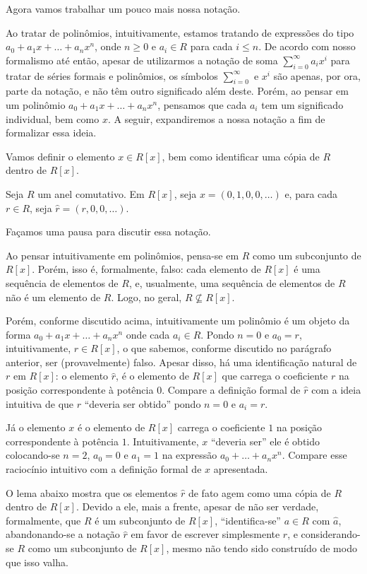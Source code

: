 Agora vamos trabalhar um pouco mais nossa notação.

Ao tratar de polinômios, intuitivamente, estamos tratando de expressões do tipo $a_0+a_1x+\dots+a_nx^n$, onde $n\geq 0$ e $a_i \in R$ para cada $i\leq n$.
De acordo com nosso formalismo até então, apesar de utilizarmos a notação de soma $\sum_{i=0}^\infty a_i x^i$ para tratar de séries formais e polinômios, os símbolos $\sum_{i=0}^\infty$ e $x^i$ são apenas, por ora, parte da notação, e não têm outro significado além deste. Porém, ao pensar em um polinômio $a_0+a_1x+\dots+a_nx^n$, pensamos que cada $a_i$ tem um significado individual, bem como $x$. A seguir, expandiremos a nossa notação a fim de formalizar essa ideia.

Vamos definir o elemento $x \in R[x]$, bem como identificar uma cópia de $R$ dentro de $R[x]$.

\begin{definition}
    Seja $R$ um anel comutativo. Em $R[x]$, seja $x=(0, 1, 0, 0, \dots)$ e, para cada $r \in R$, seja $\hat r=(r, 0, 0, \dots)$.
\end{definition}

Façamos uma pausa para discutir essa notação.

Ao pensar intuitivamente em polinômios, pensa-se em $R$ como um subconjunto de $R[x]$.
Porém, isso é, formalmente, falso: cada elemento de $R[x]$ é uma sequência de elementos de $R$, e, usualmente, uma sequência de elementos de $R$ não é um elemento de $R$.
Logo, no geral, $R\not \subseteq R[x]$.

Porém, conforme discutido acima, intuitivamente um polinômio é um objeto da forma $a_0+a_1x+\dots+a_nx^n$ onde cada $a_i \in R$.
Pondo $n=0$ e $a_0=r$, intuitivamente, $r\in R[x]$, o que sabemos, conforme discutido no parágrafo anterior, ser (provavelmente) falso.
Apesar disso, há uma identificação natural de $r$ em $R[x]$: o elemento $\hat r$, é o elemento de $R[x]$ que carrega o coeficiente $r$ na posição correspondente à potência $0$. Compare a definição formal de $\hat r$ com a ideia intuitiva de que $r$ ``deveria ser obtido'' pondo $n=0$ e $a_i=r$.

Já o elemento $x$ é o elemento de $R[x]$ carrega o coeficiente $1$ na posição correspondente à potência $1$. Intuitivamente, $x$ ``deveria ser'' ele é obtido colocando-se $n=2$, $a_0=0$ e $a_1=1$ na expressão $a_0+\dots+a_nx^n$. Compare esse raciocínio intuitivo com a definição formal de $x$ apresentada.

O lema abaixo mostra que os elementos $\hat r$ de fato agem como uma cópia de $R$ dentro de $R[x]$.
Devido a ele, mais a frente, apesar de não ser verdade, formalmente, que $R$ é um subconjunto de $R[x]$, ``identifica-se'' $a \in R$ com $\hat a$, abandonando-se a notação $\hat r$ em favor de escrever simplesmente $r$, e considerando-se $R$ como um subconjunto de $R[x]$, mesmo não tendo sido construído de modo que isso valha.

